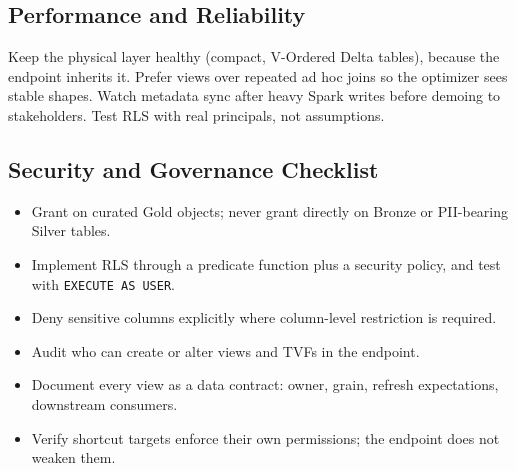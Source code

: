 \subsection{Performance and Reliability}
Keep the physical layer healthy (compact, V-Ordered Delta tables), because the endpoint inherits it. Prefer views over repeated ad hoc joins so the optimizer sees stable shapes. Watch metadata sync after heavy Spark writes before demoing to stakeholders. Test RLS with real principals, not assumptions.

\subsection{Security and Governance Checklist}
\begin{itemize}
    \item Grant on curated Gold objects; never grant directly on Bronze or PII-bearing Silver tables.
    \item Implement RLS through a predicate function plus a security policy, and test with \texttt{EXECUTE AS USER}.
    \item Deny sensitive columns explicitly where column-level restriction is required.
    \item Audit who can create or alter views and TVFs in the endpoint.
    \item Document every view as a data contract: owner, grain, refresh expectations, downstream consumers.
    \item Verify shortcut targets enforce their own permissions; the endpoint does not weaken them.
\end{itemize}


